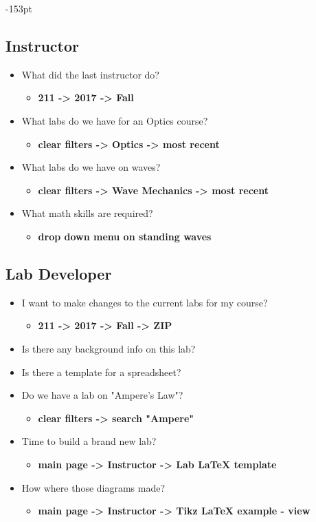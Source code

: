 \begin{adjustwidth}{}{-153pt}
\subsection{\bf Instructor}
\begin{itemize}
\item What did the last instructor do?
\begin{itemize} \item {\bf 211 -> 2017 -> Fall}  \end{itemize}
\item What labs do we have for an Optics course?
\begin{itemize} \item {\bf clear filters -> Optics -> most recent}  \end{itemize}
\item What labs do we have on waves? 
\begin{itemize} \item {\bf clear filters -> Wave Mechanics -> most recent}  \end{itemize}
\item What math skills are required?
\begin{itemize} \item {\bf drop down menu on standing waves}  \end{itemize}
\end{itemize}

\subsection{\bf Lab Developer}
\begin{itemize}
\item I want to make changes to the current labs for my course?
\begin{itemize} \item {\bf 211 -> 2017 -> Fall -> ZIP}  \end{itemize}
\item Is there any background info on this lab?
\item Is there a template for a spreadsheet?
\item Do we have a lab on "Ampere's Law"?
\begin{itemize} \item {\bf clear filters -> search "Ampere"}  \end{itemize}
\item Time to build a brand new lab?
\begin{itemize} \item {\bf main page -> Instructor -> Lab LaTeX template}\end{itemize}
\item How where those diagrams made?
\begin{itemize} \item {\bf main page -> Instructor -> Tikz LaTeX example - view}\end{itemize}
\end{itemize}


\end{adjustwidth}
